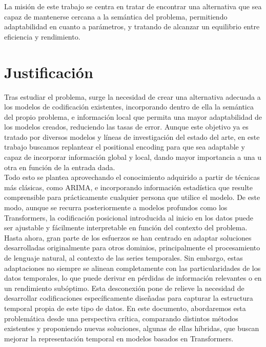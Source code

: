 La misión de este trabajo se centra en tratar de encontrar una alternativa que sea capaz de mantenerse cercana a la semántica del problema, permitiendo adaptabilidad en cuanto a parámetros, y tratando de alcanzar un equilibrio entre eficiencia y rendimiento.\\

\section{Justificación}

Tras estudiar el problema, surge la necesidad de crear una alternativa adecuada a los modelos de codificación existentes, incorporando dentro de ella la semántica del propio problema, e información local que permita una mayor adaptabilidad de los modelos creados, reduciendo las tasas de error. Aunque este objetivo ya es tratado por diversos modelos y líneas de investigación del estado del arte, en este trabajo buscamos replantear el positional encoding para que sea adaptable y capaz de incorporar información global y local, dando mayor importancia a una u otra en función de la entrada dada.\\

Todo esto se plantea aprovechando el conocimiento adquirido a partir de técnicas más clásicas, como ARIMA, e incorporando información estadística que resulte comprensible para prácticamente cualquier persona que utilice el modelo. De este modo, aunque se recurra posteriormente a modelos profundos como los Transformers, la codificación posicional introducida  al inicio en los datos puede ser ajustable y fácilmente interpretable en función del contexto del problema.\\
 
Hasta ahora, gran parte de los esfuerzos se han centrado en adaptar soluciones desarrolladas originalmente para otros dominios, principalmente el procesamiento de lenguaje natural, al contexto de las series temporales. Sin embargo, estas adaptaciones no siempre se alinean completamente con las particularidades de los datos temporales, lo que puede derivar en pérdidas de información relevantes o en un rendimiento subóptimo. Esta desconexión pone de relieve la necesidad de desarrollar codificaciones específicamente diseñadas para capturar la estructura temporal propia de este tipo de datos. En este documento, abordaremos esta problemática desde una perspectiva crítica, comparando distintos métodos existentes y proponiendo nuevas soluciones, algunas de ellas híbridas, que buscan mejorar la representación temporal en modelos basados en Transformers.

